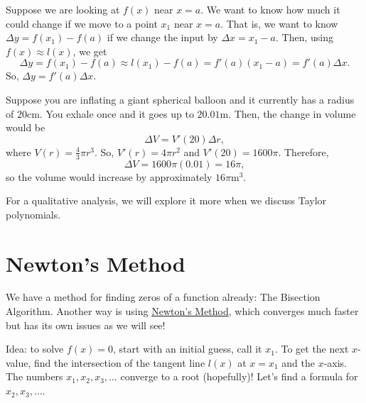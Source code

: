 Suppose we are looking at $ f(x) $ near $ x=a $. We want to know how much it could change if we move to a point
$ x_1 $ near $ x=a $. That is, we want to know $ \Delta y=f(x_1)-f(a) $ if we change the input by $ \Delta x=x_1-a $.
Then, using $ f(x)\approx l(x) $, we get
\[ \Delta y=f(x_1)-f(a)\approx l(x_1)-f(a)=f'(a)(x_1-a)=f'(a)\Delta x. \]
So, $ \Delta y=f'(a)\Delta x $.
\begin{Example}{}{}
    Suppose you are inflating a giant spherical balloon and it currently has a radius of $20$cm. You exhale once and it goes up to $20.01$m.
    Then, the change in volume would be
    \[ \Delta V=V'(20)\Delta r, \]
    where $ V(r)=\frac{4}{3}\pi r^3 $. So, $ V'(r)=4\pi r^2 $ and $ V'(20)=1600\pi $. Therefore,
    \[ \Delta V=1600\pi(0.01)=16\pi, \]
    so the volume would increase by approximately $ 16\pi\text{m}^3 $.
\end{Example}
\begin{Remark}{}{}
    For a qualitative analysis, we will explore it more when we discuss Taylor polynomials.
\end{Remark}
\section{Newton's Method}
We have a method for finding zeros of a function already: The Bisection Algorithm. Another way is
using \underline{Newton's Method}, which converges much faster but has its own issues as we will see!

Idea: to solve $ f(x)=0 $, start with an initial guess, call it $ x_1 $. To get the next $ x $-value,
find the intersection of the tangent line $ l(x) $ at $ x=x_1 $ and the $ x $-axis. The numbers
$ x_1,x_2,x_3,\ldots $ converge to a root (hopefully)! Let's find a formula for $ x_2,x_3,\ldots $.

